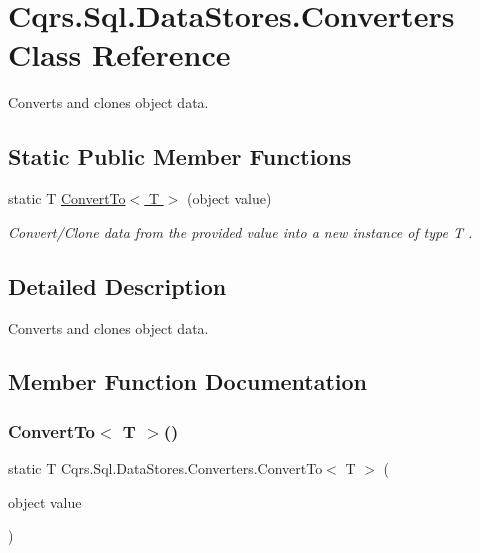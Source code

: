 \hypertarget{classCqrs_1_1Sql_1_1DataStores_1_1Converters}{}\section{Cqrs.\+Sql.\+Data\+Stores.\+Converters Class Reference}
\label{classCqrs_1_1Sql_1_1DataStores_1_1Converters}


Converts and clones object data.  


\subsection*{Static Public Member Functions}
\begin{DoxyCompactItemize}
\item 
static T \hyperlink{classCqrs_1_1Sql_1_1DataStores_1_1Converters_a40b58c9a649e6c55ec973ab8fc4e1291_a40b58c9a649e6c55ec973ab8fc4e1291}{Convert\+To$<$ T $>$} (object value)
\begin{DoxyCompactList}\small\item\em Convert/\+Clone data from the provided {\itshape value}  into a new instance of type {\itshape T} . \end{DoxyCompactList}\end{DoxyCompactItemize}


\subsection{Detailed Description}
Converts and clones object data. 



\subsection{Member Function Documentation}
\mbox{\label{classCqrs_1_1Sql_1_1DataStores_1_1Converters_a40b58c9a649e6c55ec973ab8fc4e1291_a40b58c9a649e6c55ec973ab8fc4e1291}} 
\subsubsection{\texorpdfstring{Convert\+To$<$ T $>$()}{ConvertTo< T >()}}
{\footnotesize\ttfamily static T Cqrs.\+Sql.\+Data\+Stores.\+Converters.\+Convert\+To$<$ T $>$ (\begin{DoxyParamCaption}\item[{object}]{value }\end{DoxyParamCaption})\hspace{0.3cm}{\ttfamily [static]}}



